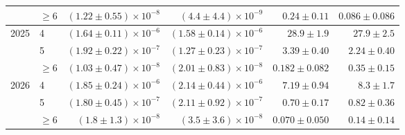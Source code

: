 \begin{table}[htbp]
\begin{tabular}{llrrrr}
 & $\geq 6$ & $(1.22 \pm 0.55) \times 10^{-8}$ & $(4.4 \pm 4.4) \times 10^{-9}$ & $0.24 \pm 0.11$ & $0.086 \pm 0.086$ \\
\hline
2025 & 4 & $(1.64 \pm 0.11) \times 10^{-6}$ & $(1.58 \pm 0.14) \times 10^{-6}$ & $28.9 \pm 1.9$ & $27.9 \pm 2.5$ \\
 & 5 & $(1.92 \pm 0.22) \times 10^{-7}$ & $(1.27 \pm 0.23) \times 10^{-7}$ & $3.39 \pm 0.40$ & $2.24 \pm 0.40$ \\
 & $\geq 6$ & $(1.03 \pm 0.47) \times 10^{-8}$ & $(2.01 \pm 0.83) \times 10^{-8}$ & $0.182 \pm 0.082$ & $0.35 \pm 0.15$ \\
\hline
2026 & 4 & $(1.85 \pm 0.24) \times 10^{-6}$ & $(2.14 \pm 0.44) \times 10^{-6}$ & $7.19 \pm 0.94$ & $8.3 \pm 1.7$ \\
 & 5 & $(1.80 \pm 0.45) \times 10^{-7}$ & $(2.11 \pm 0.92) \times 10^{-7}$ & $0.70 \pm 0.17$ & $0.82 \pm 0.36$ \\
 & $\geq 6$ & $(1.8 \pm 1.3) \times 10^{-8}$ & $(3.5 \pm 3.6) \times 10^{-8}$ & $0.070 \pm 0.050$ & $0.14 \pm 0.14$ \\
\hline
\end{tabular}
\end{table}
